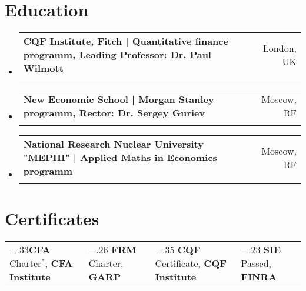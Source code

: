 \documentclass[letterpaper,hidelinks]{article}
\makeatletter
\newcommand{\resumeSubheading}[4]{
  \vspace{-2pt}\item
    \begin{tabular*}{0.97\textwidth}[t]{l@{\extracolsep{\fill}}r}
      \textbf{#1} & #2 \\
      \text{\small#3} & \text{\small #4} \\
    \end{tabular*}\vspace{-7pt}
}
\newcommand{\resumeSubHeadingListStart}{\begin{itemize}[leftmargin=0.1in, label={}]}
\newcommand{\resumeSubHeadingListEnd}{\end{itemize}}
\makeatother
\begin{document}
\section{Education}
\vspace{2pt}
\resumeSubHeadingListStart
\resumeSubheading
{{CQF Institute, Fitch | Quantitative finance programm, Leading Professor: Dr. Paul Wilmott}}{London, UK\vspace{-2pt}}
{Certificate in Quantitative Finance}{Jan 2022 \textbf{--} Jul 2022}\vspace{3pt}
\resumeSubheading
{{New Economic School | Morgan Stanley programm, Rector: Dr. Sergey Guriev}}{Moscow, RF\vspace{-2pt}}
{Masters in Finance}{Sep 2013 \textbf{--} Jul 2015}\vspace{3pt}
\resumeSubheading
{{National Research Nuclear University "MEPHI" | Applied Maths in Economics programm}}{Moscow, RF\vspace{-2pt}}
{Masters in Mathematical Economics}{Sep 2007 \textbf{--} Jul 2012}
\resumeSubHeadingListEnd

\vspace{-3pt}
\section{Certificates}
\resumeSubHeadingListStart
\small{\item{
  \begin{tabularx}{0.96\textwidth} { 
     >{\centering\arraybackslash\hsize=.33\hsize}X 
    || >{\centering\arraybackslash\hsize=.26\hsize}X 
    || >{\centering\arraybackslash\hsize=.35\hsize}X  
    || >{\centering\arraybackslash\hsize=.23\hsize}X } 
    \textbf{CFA} Charter$\mathbb{}^\ast$, \textbf{CFA Institute} & 
    \textbf{FRM} Charter, \textbf{GARP} & 
    \textbf{CQF} Certificate, \textbf{CQF Institute} & 
    \textbf{SIE} Passed, \textbf{FINRA}
  \end{tabularx}
}}
\resumeSubHeadingListEnd
\end{document}
